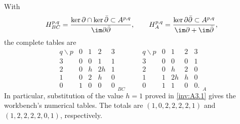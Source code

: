 \begin{proposition}
With
\[
H^{p,q}_{BC}=
\frac{\ker\partial\cap\ker\bar\partial\subset A^{p,q}}
{\im\partial\bar\partial},\qquad
H^{p,q}_{A}=
\frac{\ker\partial\bar\partial\subset A^{p,q}}
{\im\partial+\im\bar\partial},
\]
the complete tables are
\begin{equation}\label{inv:eq:C-BC-A}
\begin{array}{c|rrrr}
q\backslash p&0&1&2&3\\\hline
3&0&0&1&1\\
2&0&h&2h&1\\
1&0&2&h&0\\
0&1&0&0&0
\end{array}_{BC}
\qquad
\begin{array}{c|rrrr}
q\backslash p&0&1&2&3\\\hline
3&0&0&0&1\\
2&0&h&2&0\\
1&1&2h&h&0\\
0&1&1&0&0.
\end{array}_{A}
\end{equation}
In particular, substitution of the value $h=1$ proved in \ref{inv:A3.1} gives
the workbench's numerical tables.  The totals are
$(1,0,2,2,2,2,1)$ and $(1,2,2,2,2,0,1)$, respectively.
\end{proposition}


